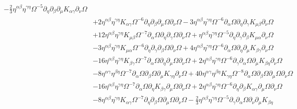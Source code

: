 \documentclass[10pt,letterpaper]{article}
\begin{document}
\begin{align}
 -  \tfrac{2}{3} \eta^{\alpha \beta} \eta^{\gamma \eta} \Omega^{-5} \partial_{\eta}\partial_{\beta}\partial_{\mu}K_{\alpha \gamma} \partial_{\nu}\Omega\nonumber\\
& + 2 \eta^{\alpha \beta} \eta^{\gamma \eta} K_{\alpha \gamma} \Omega^{-6} \partial_{\eta}\partial_{\beta}\partial_{\mu}\Omega \partial_{\nu}\Omega
 - 3 \eta^{\alpha \beta} \eta^{\gamma \eta} \Omega^{-6} \partial_{\alpha}\Omega \partial_{\eta}\partial_{\gamma}K_{\mu \beta} \partial_{\nu}\Omega\nonumber\\
& + 12 \eta^{\alpha \beta} \eta^{\gamma \eta} K_{\mu \beta} \Omega^{-7} \partial_{\alpha}\Omega \partial_{\eta}\partial_{\gamma}\Omega \partial_{\nu}\Omega
 + \eta^{\alpha \beta} \eta^{\gamma \eta} \Omega^{-5} \partial_{\eta}\partial_{\gamma}\partial_{\beta}K_{\mu \alpha} \partial_{\nu}\Omega\nonumber\\
& - 3 \eta^{\alpha \beta} \eta^{\gamma \eta} K_{\mu \alpha} \Omega^{-6} \partial_{\eta}\partial_{\gamma}\partial_{\beta}\Omega \partial_{\nu}\Omega
 + 4 \eta^{\alpha \beta} \eta^{\gamma \eta} \Omega^{-6} \partial_{\alpha}\Omega \partial_{\eta}\partial_{\mu}K_{\beta \gamma} \partial_{\nu}\Omega\nonumber\\
& - 16 \eta^{\alpha \beta} \eta^{\gamma \eta} K_{\beta \gamma} \Omega^{-7} \partial_{\alpha}\Omega \partial_{\eta}\partial_{\mu}\Omega \partial_{\nu}\Omega
 + 2 \eta^{\alpha \beta} \eta^{\gamma \eta} \Omega^{-6} \partial_{\gamma}\partial_{\alpha}\Omega \partial_{\mu}K_{\beta \eta} \partial_{\nu}\Omega\nonumber\\
& - 8 \eta^{\alpha \gamma} \eta^{\beta \eta} \Omega^{-7} \partial_{\alpha}\Omega \partial_{\beta}\Omega \partial_{\mu}K_{\gamma \eta} \partial_{\nu}\Omega
 + 40 \eta^{\alpha \gamma} \eta^{\beta \eta} K_{\gamma \eta} \Omega^{-8} \partial_{\alpha}\Omega \partial_{\beta}\Omega \partial_{\mu}\Omega \partial_{\nu}\Omega\nonumber\\
& - 16 \eta^{\alpha \beta} \eta^{\gamma \eta} \Omega^{-7} \partial_{\alpha}\Omega \partial_{\eta}K_{\beta \gamma} \partial_{\mu}\Omega \partial_{\nu}\Omega
 + 2 \eta^{\alpha \beta} \eta^{\gamma \eta} \Omega^{-6} \partial_{\eta}\partial_{\beta}K_{\alpha \gamma} \partial_{\mu}\Omega \partial_{\nu}\Omega\nonumber\\
& - 8 \eta^{\alpha \beta} \eta^{\gamma \eta} K_{\alpha \gamma} \Omega^{-7} \partial_{\eta}\partial_{\beta}\Omega \partial_{\mu}\Omega \partial_{\nu}\Omega
 -  \tfrac{2}{3} \eta^{\alpha \beta} \eta^{\gamma \eta} \Omega^{-5} \partial_{\gamma}\partial_{\alpha}\Omega \partial_{\nu}\partial_{\mu}K_{\beta \eta}\nonumber\\

\end{align}
\end{document}
